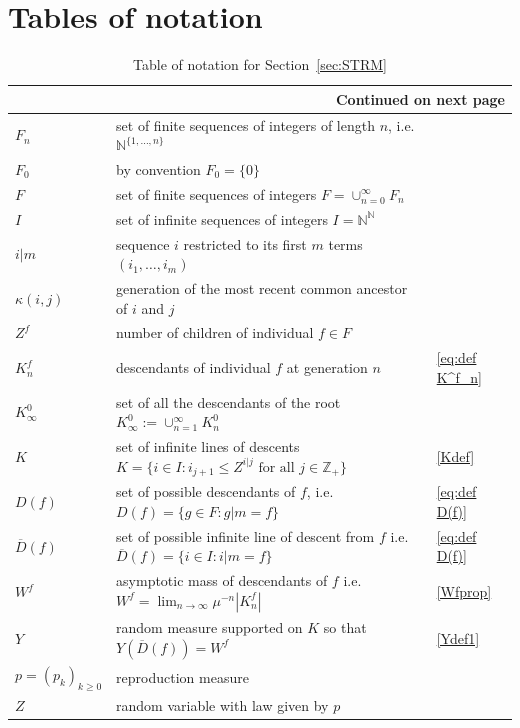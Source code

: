 \documentclass[12pt]{article}
\numberwithin{theorem}{section}
\theoremstyle{def}
\numberwithin{equation}{section}
\newcommand{\Z}{\mathbb{Z}}
\newcommand{\N}{\mathbb{N}}
\newcommand{\ARXIV}[1]{#1}
\begin{document}
\ARXIV{
\section{Tables of notation}
\begin{center}
\begin{longtable}{|l|l|l|}\caption{Table of notation for Section~\ref{sec:STRM}}
	\\
\hline 
\endfirsthead
\hline 
\endhead

\hline \multicolumn{3}{|r|}{{Continued on next page}} \\ \hline
\endfoot

\hline 
\endlastfoot
		$F_n$  & set of finite sequences of integers of length $n$, i.e. $\N^{\{1,\dots,n\}}$& \\
		$F_0$  & by convention $F_0=\{0\}$ & \\
		$F$  &  set of finite sequences of integers $F=\cup_{n=0}^\infty F_n$& \\
		$I$  &  set of infinite sequences of integers $I=\N^\N$& \\
		$i|m$  & sequence $i$ restricted to its first $m$ terms $(i_1,\dots, i_m)$& \\
		$\kappa(i,j)$  & generation of the most recent common ancestor of $i$ and $j$& \\
		$Z^f$  & number of children of individual $f\in F$& \\
		$K^f_n$  &  descendants of individual $f$ at generation $n$& \eqref{eq:def K^f_n}\\
		$K_\infty^0$  & set of all the descendants of the root $K_\infty^0:=\cup_{n=1}^\infty K^0_n$& \\
		$K$  & set of infinite lines of descents $K=\{i\in I: i_{j+1}\le Z^{i|j}\text{ for all }j\in\Z_+\}$& \eqref{Kdef}\\
		$D(f)$  & set of possible descendants of $f$, i.e. $D(f)=\{g\in F:g|m=f\}$& \eqref{eq:def D(f)}\\
		$\overline D(f)$  & set of possible infinite line of descent from $f$ i.e.  $\overline D(f)=\{i\in I:i|m=f\}$& \eqref{eq:def D(f)} \\
		$W^f$  & asymptotic mass of descendants of $f$ i.e. $W^f=\lim_{n\to\infty}\mu^{-n}|K_n^f|$& \eqref{Wfprop}\\
		$Y$ & random measure supported on $K$ so that $Y(\overline D(f))=W^f$& \eqref{Ydef1}\\
		\hline
		$p=(p_k)_{k\geq 0}$  & reproduction measure & \\
		$Z$ & random variable with law given by $p$ & \\

\end{longtable}
\end{center}}
\end{document}
